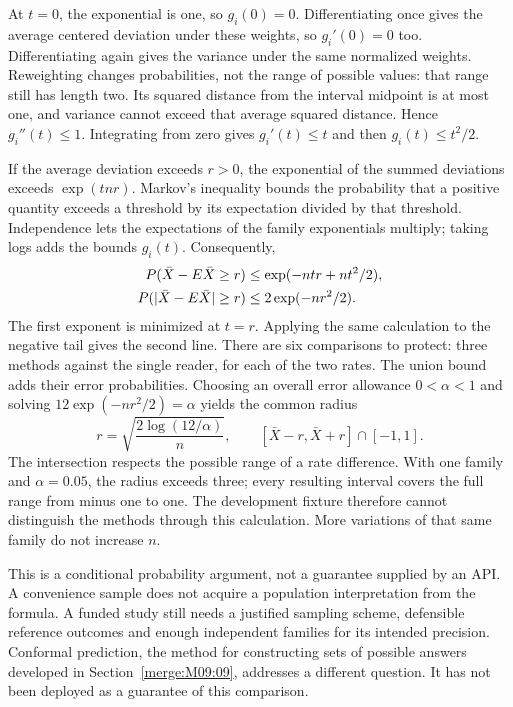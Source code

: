 \documentclass[12pt,a4paper,oneside,openany]{book}
\begin{document}
At $t=0$, the exponential is one, so $g_i(0)=0$. Differentiating once gives the
average centered deviation under these weights, so $g_i'(0)=0$ too.
Differentiating again gives the variance under the same normalized weights.
Reweighting changes probabilities, not the range of possible values: that range
still has length two. Its squared distance from the interval midpoint is at
most one, and variance cannot exceed that average squared distance. Hence
$g_i''(t)\leq1$. Integrating from zero gives $g_i'(t)\leq t$ and then
$g_i(t)\leq t^2/2$.

If the average deviation exceeds $r>0$, the exponential of the summed deviations
exceeds $\exp(tnr)$. Markov's inequality bounds the probability that a positive
quantity exceeds a threshold by its expectation divided by that threshold.
Independence lets the expectations of the family exponentials multiply; taking
logs adds the bounds $g_i(t)$. Consequently,
\begin{align}
 P(\bar X-E\bar X\geq r)
 &\leq \exp(-ntr+nt^2/2),\notag\\
 P(|\bar X-E\bar X|\geq r)
 &\leq 2\exp(-nr^2/2).
 \label{eq:family-tail}
\end{align}
The first exponent is minimized at $t=r$. Applying the same calculation to the
negative tail gives the second line. There are six comparisons to protect:
three methods against the single reader, for each of the two rates. The union
bound adds their error probabilities. Choosing an overall error allowance
$0<\alpha<1$ and solving $12\exp(-nr^2/2)=\alpha$ yields the common radius
\begin{equation}
 r=\sqrt{\frac{2\log(12/\alpha)}{n}},\qquad
 [\bar X-r,\bar X+r]\cap[-1,1].
 \label{eq:family-interval}
\end{equation}
The intersection respects the possible range of a rate difference. With one
family and $\alpha=0.05$, the radius exceeds three; every resulting interval
covers the full range from minus one to one. The development fixture therefore
cannot distinguish the methods through this calculation. More variations of
that same family do not increase $n$.

This is a conditional probability argument, not a guarantee supplied by an
API. A convenience sample does not acquire a population interpretation from
the formula. A funded study still needs a justified sampling scheme, defensible
reference outcomes and enough independent families for its intended precision.
Conformal prediction, the method for constructing sets of possible answers
developed in Section~\ref{merge:M09:09}, addresses a different question. It has
not been deployed as a guarantee of this comparison.
\end{document}
